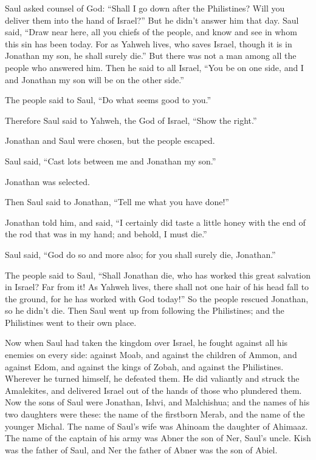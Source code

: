  Saul asked counsel of God: ``Shall I go down after the
Philistines? Will you deliver them into the hand of Israel?'' But he
didn't answer him that day.  Saul said, ``Draw near here,
all you chiefs of the people, and know and see in whom this sin has been
today.  For as Yahweh lives, who saves Israel, though it is
in Jonathan my son, he shall surely die.'' But there was not a man among
all the people who answered him.  Then he said to all
Israel, ``You be on one side, and I and Jonathan my son will be on the
other side.''

The people said to Saul, ``Do what seems good to you.''

 Therefore Saul said to Yahweh, the God of Israel, ``Show
the right.''

Jonathan and Saul were chosen, but the people escaped.

 Saul said, ``Cast lots between me and Jonathan my son.''

Jonathan was selected.

 Then Saul said to Jonathan, ``Tell me what you have
done!''

Jonathan told him, and said, ``I certainly did taste a little honey with
the end of the rod that was in my hand; and behold, I must die.''

 Saul said, ``God do so and more also; for you shall surely
die, Jonathan.''

 The people said to Saul, ``Shall Jonathan die, who has
worked this great salvation in Israel? Far from it! As Yahweh lives,
there shall not one hair of his head fall to the ground, for he has
worked with God today!'' So the people rescued Jonathan, so he didn't
die.  Then Saul went up from following the Philistines; and
the Philistines went to their own place.

 Now when Saul had taken the kingdom over Israel, he fought
against all his enemies on every side: against Moab, and against the
children of Ammon, and against Edom, and against the kings of Zobah, and
against the Philistines. Wherever he turned himself, he defeated them.
 He did valiantly and struck the Amalekites, and delivered
Israel out of the hands of those who plundered them.  Now
the sons of Saul were Jonathan, Ishvi, and Malchishua; and the names of
his two daughters were these: the name of the firstborn Merab, and the
name of the younger Michal.  The name of Saul's wife was
Ahinoam the daughter of Ahimaaz. The name of the captain of his army was
Abner the son of Ner, Saul's uncle.  Kish was the father of
Saul, and Ner the father of Abner was the son of Abiel.

